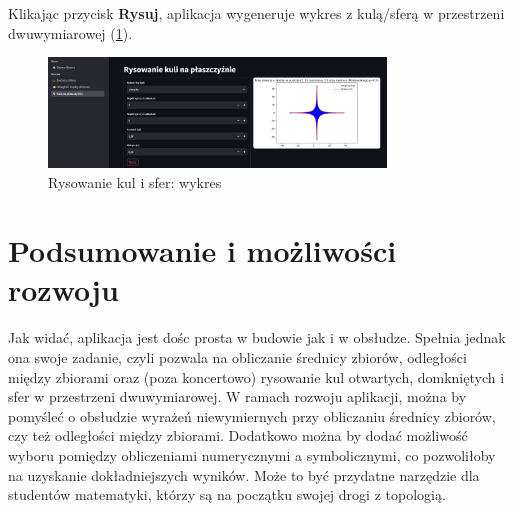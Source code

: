 \documentclass[article,11pt]{mwrep}
\begin{document}
Klikając przycisk \textbf{Rysuj}, aplikacja wygeneruje wykres z kulą/sferą w przestrzeni dwuwymiarowej (\ref{rys:rw}). 

\begin{figure}[H] 
    \centering
    \includegraphics[width=0.8\textwidth]{figure/Screenshot_9.jpg}
    \caption{Rysowanie kul i sfer: wykres}\label{rys:rw}
\end{figure}

\chapter{Podsumowanie i możliwości rozwoju}

Jak widać, aplikacja jest dośc prosta w budowie jak i w obsłudze. Spełnia jednak ona swoje zadanie, czyli pozwala na obliczanie średnicy zbiorów, odległości między zbiorami oraz (poza koncertowo) rysowanie kul otwartych, domkniętych i sfer w przestrzeni dwuwymiarowej. W ramach rozwoju aplikacji, można by pomyśleć o obsłudzie wyrażeń niewymiernych przy obliczaniu średnicy zbiorów, czy też odległości między zbiorami. Dodatkowo można by dodać możliwość wyboru pomiędzy obliczeniami numerycznymi a symbolicznymi, co pozwoliłoby na uzyskanie dokładniejszych wyników. Może to być przydatne narzędzie dla studentów matematyki, którzy są na początku swojej drogi z topologią.
\end{document}
